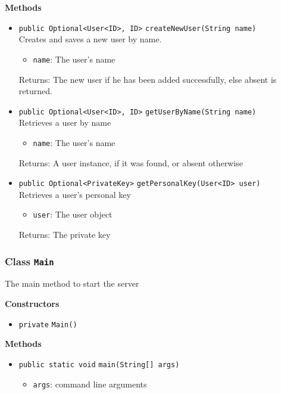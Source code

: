 \textbf{Methods}
\begin{itemize}
\item \lstinline|public Optional<User<ID>, ID>| \lstinline|createNewUser|\lstinline|(String name)|\\
Creates and saves a new user by name.
\begin{itemize}
\item \lstinline|name|: The user's name
\end{itemize}

Returns: The new user if he has been added successfully, else absent is returned.

\item \lstinline|public Optional<User<ID>, ID>| \lstinline|getUserByName|\lstinline|(String name)|\\
Retrieves a user by name
\begin{itemize}
\item \lstinline|name|: The user's name
\end{itemize}

Returns: A user instance, if it was found, or absent otherwise

\item \lstinline|public Optional<PrivateKey>| \lstinline|getPersonalKey|\lstinline|(User<ID> user)|\\
Retrieves a user's personal key
\begin{itemize}
\item \lstinline|user|: The user object
\end{itemize}

Returns: The private key

\end{itemize}

\subsubsection{Class \lstinline|Main|}
The main method to start the server \\





\textbf{Constructors}
\begin{itemize}
\item \lstinline|private| \lstinline|Main|\lstinline|()|




\end{itemize}


\textbf{Methods}
\begin{itemize}
\item \lstinline|public static void| \lstinline|main|\lstinline|(String[] args)|

\begin{itemize}
\item \lstinline|args|: command line arguments
\end{itemize}



\end{itemize}


